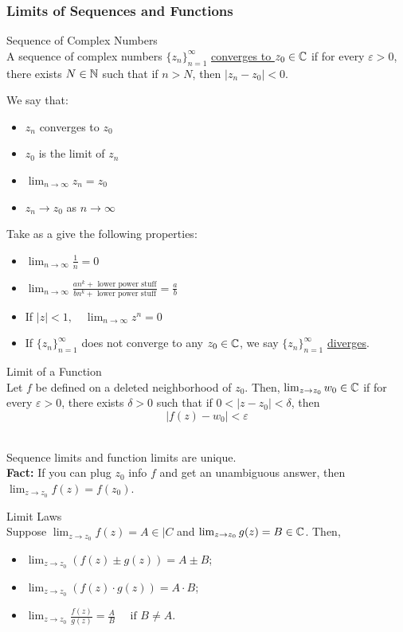 \documentclass[10pt]{paper}
\newcommand{\gspc}{\vspace{0.13cm}} %
\newcommand{\gline}[0]{\gspc\\} %
\newcommand{\ul}[1]{\underline{#1}}
\begin{document}
\subsubsection{Limits of Sequences and Functions}
\begin{definition}{Sequence of Complex Numbers}{}\gline{}
  A sequence of complex numbers $\{z_n\}^\infty_{n=1}$ \ul{converges to $z_0\in\mathbb{C}$} if for every $\varepsilon>0$, there exists $N\in\mathbb{N}$ such that if $n>N$, then $|z_n-z_0|<0$. 
\end{definition}
We say that:
\begin{itemize}
  \item $z_n$ converges to $z_0$
  \item $z_0$ is the limit of $z_n$
  \item $\lim_{n\to\infty}z_n = z_0$
  \item $z_n\to z_0$ as $n\to\infty$
\end{itemize}
Take as a give the following properties:
\begin{itemize}
  \item $\lim_{n\to\infty}\frac{1}n = 0$
  \item $\displaystyle \lim_{n\to\infty}\frac{an^k + \text{ lower power stuff}}{bn^k + \text{ lower power stuff}} = \frac{a}b$
  \item If $|z|<1,\quad \lim_{n\to\infty}z^n = 0$
  \item If $\{z_n\}_{n=1}^\infty$ does not converge to any $z_0\in\mathbb{C}$, we say $\{z_n\}^\infty_{n=1}$ \ul{diverges}.
\end{itemize}
\begin{definition}{Limit of a Function}{}\gline{}
  Let $f$ be defined on a deleted neighborhood of $z_0$. Then, $\lim_{z\to z_0}w_0\in\mathbb{C}$ if for every $\varepsilon > 0$, there exists $\delta >0$ such that if $ 0 < |z- z_0|<\delta$, then 
  \[|f(z) - w_0|<\varepsilon\]
\end{definition}
\begin{theorem}{}{}\gline{}
  Sequence limits and function limits are unique.\gline{}
  \textbf{Fact: }If you can plug $z_0$ info $f$ and get an unambiguous answer, then $\lim_{z\to z_0}f(z)=f(z_0)$. 
  \begin{corollary}{Limit Laws}{}\gline{}
    Suppose $\lim_{z\to z_0}f(z) = A\in |C$ and $\lim_{z\to z_0}g(z) = B\in\mathbb{C}$. Then, 
    \begin{itemize}
      \item $\lim_{z\to z_0}(f(z)\pm g(z)) = A\pm B$;
      \item $\lim_{z\to z_0}(f(z)\cdot g(z))=A\cdot B$;
      \item $\displaystyle\lim_{z\to z_0}\frac{f(z)}{g(z)}=\frac{A}B\quad \text{ if } B\ne A$. 
    \end{itemize}
  \end{corollary}
\end{theorem}
\end{document}

